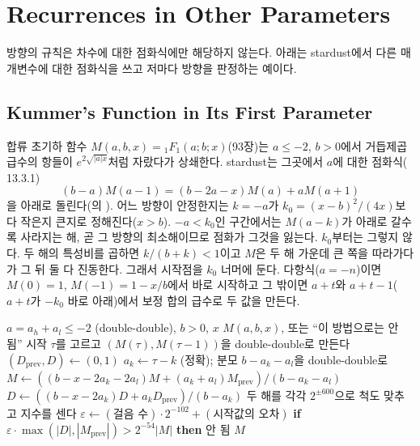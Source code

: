\section{Recurrences in Other Parameters}
\label{sec:other-recurrences}

방향의 규칙은 차수에 대한 점화식에만 해당하지 않는다. 아래는 stardust에서 다른 매개변수에 대한 점화식을 쓰고 저마다 방향을 판정하는 예이다.

\subsection{Kummer's Function in Its First Parameter}

합류 초기하 함수 $M(a,b,x)={}_1F_1(a;b;x)$(93장)는 $a\le-2$, $b>0$에서 거듭제곱 급수의 항들이 $e^{2\sqrt{|a|x}}$처럼 자랐다가 상쇄한다. stardust는 그곳에서 $a$에 대한 점화식(\cite{dlmf} 13.3.1)
\[
(b-a)M(a-1)=(b-2a-x)M(a)+aM(a+1)
\]
을 아래로 돌린다(의 ). 어느 방향이 안정한지는 $k=-a$가 $k_0=(x-b)^2/(4x)$보다 작은지 큰지로 정해진다($x>b$). $-a<k_0$인 구간에서는 $M(a-k)$가 아래로 갈수록 사라지는 해, 곧 그 방향의 최소해이므로 점화가 그것을 잃는다. $k_0$부터는 그렇지 않다. 두 해의 특성비를 곱하면 $k/(b+k)<1$이고 $M$은 두 해 가운데 큰 쪽을 따라가다가 그 뒤 둘 다 진동한다. 그래서 시작점을 $k_0$ 너머에 둔다. 다항식($a=-n$)이면 $M(0)=1$, $M(-1)=1-x/b$에서 바로 시작하고 그 밖이면 $a+t$와 $a+t-1$($a+t$가 $-k_0$ 바로 아래)에서 보정 합의 급수로 두 값을 만든다.

\begin{algorithm}[htbp]
\begin{algorithmic}[1]
\Require $a=a_h+a_l\le-2$ (double-double), $b>0$, $x$
\Ensure $M(a,b,x)$, 또는 ``이 방법으로는 안 됨''
\State 시작 $\tau$를 고르고 $(M(\tau),M(\tau-1))$을 double-double로 만든다 
\State $(D_{\mathrm{prev}},D)\gets(0,1)$ 
  \State $a_k\gets\tau-k$ (정확); 분모 $b-a_k-a_l$을 double-double로
  \State $M\gets((b-x-2a_k-2a_l)M+(a_k+a_l)M_{\mathrm{prev}})/(b-a_k-a_l)$ 
  \State $D\gets((b-x-2a_k)D+a_kD_{\mathrm{prev}})/(b-a_k)$ 
  \State 두 해를 각각 $2^{\pm600}$으로 척도 맞추고 지수를 센다
\EndFor
\State $\varepsilon\gets(\text{걸음 수})\cdot2^{-102}+(\text{시작값의 오차})$
\State \textbf{if} $\varepsilon\cdot\max(|D|,|M_{\mathrm{prev}}|)>2^{-54}|M|$ \textbf{then} \Return 안 됨 
\State \Return $M$
\end{algorithmic}
\caption{$a$에 대한 점화로 하는 $M(a,b,x)$ (stardust 의 )}
\label{alg:m-a}
\end{algorithm}

